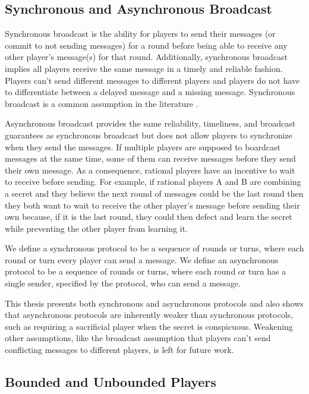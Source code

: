 \documentclass{dalcsthesis}
\begin{document}
\subsection{Synchronous and Asynchronous Broadcast}

Synchronous broadcast is the ability for players to send their messages (or commit to not sending messages) for a round before being able to receive any other player's message(s) for that round. Additionally, synchronous broadcast implies all players receive the same message in a timely and reliable fashion. Players can't send different messages to different players and players do not have to differentiate between a delayed message and a missing message. Synchronous broadcast is a common assumption in the literature \cite{halpern04, gordon06, kol08, maleka08, kol08-2, ong09, fuch10}.

Asynchronous broadcast provides the same reliability, timeliness, and broadcast guarantees as synchronous broadcast but does not allow players to synchronize when they send the messages. If multiple players are supposed to boardcast messages at the same time, some of them can receive messages before they send their own message. As a consequence, rational players have an incentive to wait to receive before sending. For example, if rational players A and B are combining a secret and they believe the next round of messages could be the last round then they both want to wait to receive the other player's message before sending their own because, if it is the last round, they could then defect and learn the secret while preventing the other player from learning it.

We define a synchronous protocol to be a sequence of rounds or turns, where each round or turn every player can send a message. We define an asynchronous protocol to be a sequence of rounds or turns, where each round or turn has a single sender, specified by the protocol, who can send a message.

This thesis presents both synchronous and asynchronous protocols and also shows that asynchronous protocols are inherently weaker than synchronous protocols, such as requiring a sacrificial player when the secret is conspicuous. Weakening other assumptions, like the broadcast assumption that players can't send conflicting messages to different players, is left for future work.

\subsection{Bounded and Unbounded Players}
\end{document}
